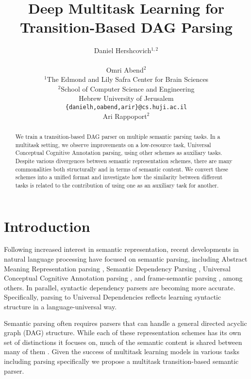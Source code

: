\documentclass[11pt,a4paper]{article}
\title{Deep Multitask Learning for Transition-Based DAG Parsing}
\author{Daniel Hershcovich$^{1,2}$ \\
  \\\And
  Omri Abend$^2$ \\
  $^1$The Edmond and Lily Safra Center for Brain Sciences \\
  $^2$School of Computer Science and Engineering \\
  Hebrew University of Jerusalem \\
  \texttt{\{danielh,oabend,arir\}@cs.huji.ac.il}
  \\\And
  Ari Rappoport$^2$
}
\date{}
\begin{document}
\maketitle
\begin{abstract}
  We train a transition-based DAG parser on multiple semantic parsing tasks.
  In a multitask setting, we observe improvements on a low-resource task,
  Universal Conceptual Cognitive Annotation parsing, using other schemes
  as auxiliary tasks.
  Despite various divergences between semantic representation schemes,
  there are many commonalities both structurally and in terms of semantic content.
  We convert these schemes into a unified format and investigate how
  the similarity between different tasks is related to the contribution of
  using one as an auxiliary task for another.
\end{abstract}

\section{Introduction}\label{sec:introduction}

Following increased interest in semantic representation,
recent developments in natural language processing have focused on semantic parsing, including
Abstract Meaning Representation parsing \cite[AMR;][]{banarescu2013abstract,damonte-17,11099},
Semantic Dependency Parsing \cite[SDP;][]{oepen2015semeval,P17-1186},
Universal Conceptual Cognitive Annotation parsing \cite[UCCA;][]{abend2013universal,hershcovich2017a},
and frame-semantic parsing \cite{gildea2002automatic,swayamdipta2017frame,ringgaard2017sling},
among others.
In parallel, syntactic dependency parsers are becoming more accurate.
Specifically, parsing to Universal Dependencies \cite[UD;][]{nivre2016universal,dozat2016deep}
reflects learning syntactic structure in a language-universal way.

Semantic parsing often requires parsers that can handle a general directed acyclic graph (DAG)
structure.
While each of these representation schemes has its own set of distinctions it focuses on,
much of the semantic content is shared between many of them \cite{abend2017state}.
Given the success of multitask learning models in various tasks
\cite{collobert2008unified,luong2015multi,ruder2017overview}
including parsing specifically
\cite{Zhang2016StackpropagationIR,P17-1186,swayamdipta2017frame,guo2016exploiting}
we propose a multitask transition-based semantic parser.
\end{document}
